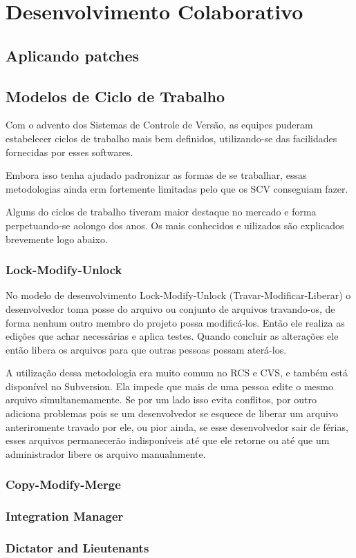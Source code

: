\chapter{Desenvolvimento Colaborativo}
\section{Aplicando patches}
\section{Modelos de Ciclo de Trabalho}

Com o advento dos Sistemas de Controle de Versão, as equipes puderam estabelecer ciclos de trabalho mais bem definidos, utilizando-se das facilidades fornecidas por esses softwares.

Embora isso tenha ajudado padronizar as formas de se trabalhar, essas metodologias ainda erm fortemente limitadas pelo que os SCV conseguiam fazer.

Alguns do ciclos de trabalho tiveram maior destaque no mercado e forma perpetuando-se aolongo dos anos. Os mais conhecidos e uilizados são explicados brevemente logo abaixo.


\subsection{Lock-Modify-Unlock}

No modelo de desenvolvimento Lock-Modify-Unlock (Travar-Modificar-Liberar) o desenvolvedor toma posse do arquivo ou conjunto de arquivos travando-os, de forma nenhum outro membro do projeto possa modificá-los. Então ele realiza as edições que achar necessárias e aplica testes. Quando concluir as alterações ele então libera os arquivos para que outras pessoas possam aterá-los.

A utilização dessa metodologia era muito comum no RCS e CVS, e também está  disponível no Subversion. Ela impede que mais de uma pessoa edite o mesmo arquivo simultanemamente. Se por um lado isso evita conflitos, por outro adiciona problemas pois se um desenvolvedor se esquece de liberar um arquivo anteriromente travado por ele, ou pior ainda, se esse desenvolvedor sair de férias, esses arquivos permanecerão indisponíveis até que ele retorne ou até que um administrador libere os arquivo manualnmente.

\subsection{Copy-Modify-Merge}
\subsection{Integration Manager}
\subsection{Dictator and Lieutenants}
